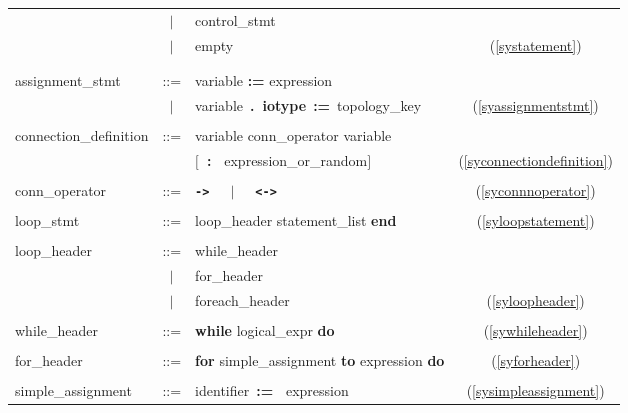 \begin{tabular}{lclc}
                   & $|$ & {control\_stmt}   \\
                   & $|$ & {empty}  & (\ref{systatement}) \\ 
& & & \\
& & & \\ 
  {assignment\_stmt} & ::= & {variable {\bf :=} expression}  \\
   & $|$ & \mbox{variable {\bf .~iotype} {\bf :=} topology\_key} & (\ref{syassignmentstmt}) \\ 
& & & \\ 
  connection\_definition & ::= & variable conn\_operator variable   \\
                         &     & $[${\bf ~:~} expression\_or\_random$]$  & (\ref{syconnectiondefinition}) \\
& & & \\
  conn\_operator & ::= & {\bf \verb&->&}~~~$|$~~~{\bf \verb&<->&}  & (\ref{syconnnoperator}) \\
& & & \\
  {loop\_stmt} & ::= & {loop\_header statement\_list {\bf end}}\index{end} & (\ref{syloopstatement}) \\
& & & \\
  {loop\_header} & ::= & {while\_header}  \\
                      & $|$ & {for\_header}  \\
                      & $|$ & {foreach\_header}\index{foreach} & (\ref{syloopheader}) \\ 
& & & \\
  {while\_header} & ::= & {{\bf while}\index{while} logical\_expr {\bf do}\index{do}} & (\ref{sywhileheader}) \\
& & & \\
  {for\_header} & ::= & {{\bf for}\index{for} simple\_assignment {\bf to}\index{to} expression {\bf do}\index{do}}
			     & (\ref{syforheader}) \\
& & & \\
  {simple\_assignment} & ::= & {identifier~{\bf :=~} expression} & (\ref{sysimpleassignment}) \\

\end{tabular}

